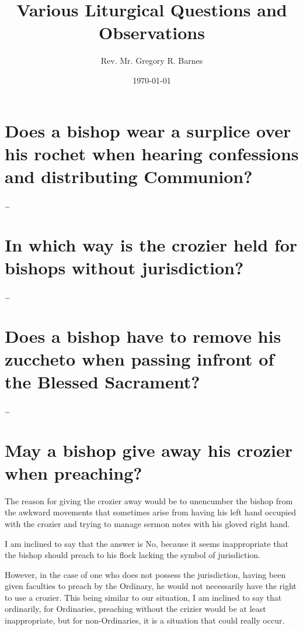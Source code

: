 \documentclass[10pt]{article}
\begin{document}
\title{Various Liturgical Questions and Observations}
\author{Rev. Mr. Gregory R. Barnes}
\date{\today}

\maketitle

\tableofcontents

\pagebreak


\pagebreak


\section{Does a bishop wear a surplice over his rochet when hearing confessions
and distributing Communion?}

\dots

\section{In which way is the crozier held for bishops without jurisdiction?}

\dots

\section{Does a bishop have to remove his zuccheto when passing infront of the
Blessed Sacrament?}

\dots

\section{May a bishop give away his crozier when preaching?}

The reason for giving the crozier away would be to unencumber the bishop from
the awkward movements that sometimes arise from having his left hand occupied
with the crozier and trying to manage sermon notes with his gloved right hand.

I am inclined to say that the answer is No, because it seems inappropriate that
the bishop should preach to his flock lacking the symbol of jurisdiction.

However, in the case of one who does not possess the jurisdiction, having been
given faculties to preach by the Ordinary, he would not necessarily have the
right to use a crozier. This being similar to our situation, I am inclined to
say that ordinarily, for Ordinaries, preaching without the crizier would be at
least inappropriate, but for non-Ordinaries, it is a situation that could really
occur. 
\end{document}
